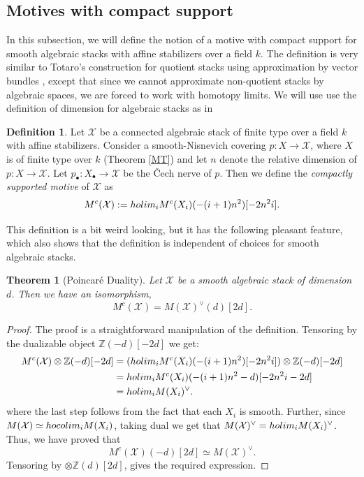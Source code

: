 \documentclass[10pt]{amsart}
\theoremstyle{plain}
\newtheorem{theorem}[thm]{Theorem}
\theoremstyle{definition}
\newtheorem{definition}[thm]{Definition}
\newcommand{\sX}{{\mathcal X}}
\newcommand{\Z}{{\mathbb Z}}
\newcommand{\hocolim}{{\rm hocolim \,}}
\newcommand{\holim}{{\rm holim \,}}
\newcommand{\spref}[1]{\href{http://stacks.math.columbia.edu/tag/#1}{#1}}
\begin{document}
\subsection{Motives with compact support}

In this subsection, we will define the notion of a motive with compact support for smooth algebraic stacks with affine stabilizers over a field $k$. The definition is very similar to Totaro's construction for quotient stacks using approximation by vector bundles \cite{TotaroChow}, except that since we cannot approximate non-quotient stacks by algebraic spaces, we are forced to work with homotopy limits. We will use use the definition of dimension for algebraic stacks as in \cite[Tag \spref{0AFL}]{stacks-project}

\begin{definition}
	Let $\sX$ be a connected algebraic stack of finite type over a field $k$ with affine stabilizers. Consider a smooth-Nisnevich covering $p:X\rightarrow\sX$, where $X$ is of finite type over $k$ (Theorem \ref{MT}) and let $n$ denote the relative dimension of $p: X\rightarrow\sX$. Let  $p_{\bullet}:X_{\bullet}\rightarrow \sX$ be the \v{C}ech nerve of $p$. Then we define the \textit{compactly supported motive} of $\sX$ as
	\[M^c(\sX):= \holim\!_i M^c(X_i)(-(i+1)n^2)[-2n^2i].\]
\end{definition}

This definition is a bit weird looking, but it has the following pleasant feature, which also shows that the definition is independent of choices for smooth algebraic stacks.

\begin{theorem}[Poincar\'{e} Duality]
	Let $\sX$ be a smooth algebraic stack of dimension $d$. Then we have an isomorphism, 
	\[M^c(\sX) = M(\sX)^\vee(d)[2d].\]
\end{theorem}

\begin{proof}
	The proof is a straightforward manipulation of the definition. Tensoring by the dualizable object $\Z(-d)[-2d]$ we get:
	\begin{align*}
	M^c(\sX)\otimes \Z(-d)[-2d] &= (\holim\!_i M^c(X_i)(-(i+1)n^2)[-2n^2i])\otimes \Z(-d)[-2d]\\
	&= \holim\!_i M^c(X_i)(-(i+1)n^2-d)[-2n^2i-2d]\\
	&= \holim\!_i M(X_i)^\vee.
	\end{align*}
	where the last step follows from the fact that each $X_i$ is smooth. Further, since $M(\sX)\simeq \hocolim\!_iM(X_i)$, taking dual we get that $M(\sX)^\vee=\holim\!_i M(X_i)^\vee$. Thus, we have proved that
	\[M^c(\sX)(-d)[2d]\simeq M(\sX)^\vee.\]
	Tensoring by $\otimes \Z(d)[2d]$, gives the required expression.
\end{proof}
\end{document}
